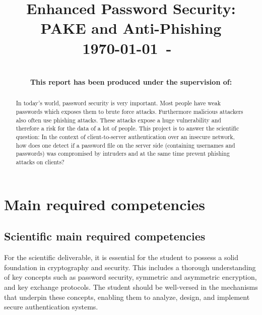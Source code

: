 \documentclass[conference,compsoc]{IEEEtran}
\begin{document}
\title{Enhanced Password Security: PAKE and Anti-Phishing\\
{\small \today~-~\currenttime}}
 
\author{
\\
{\bf This report has been produced under the supervision of:}\\
%
}

\maketitle

\begin{abstract}

In today's world, password security is very important. Most people have weak
	passwords which exposes them to brute force attacks. Furthermore
	malicious attackers also often use phishing attacks. These attacks
	expose a huge vulnerability and therefore a risk for the data of a lot
	of people. This project is to answer the scientific question: In the
	context of client-to-server authentication over an insecure network,
	how does one detect if a password file on the server side (containing
	usernames and passwords) was compromised by intruders and at the same
	time prevent phishing attacks on clients?

\end{abstract}

\IEEEpeerreviewmaketitle

\section{Main required competencies} 

\subsection{Scientific main required competencies} 
For the scientific deliverable, it is essential for the student to possess a
solid foundation in cryptography and security. This includes a thorough
understanding of key concepts such as password security, symmetric and
asymmetric encryption, and key exchange protocols. The student should be
well-versed in the mechanisms that underpin these concepts, enabling them to
analyze, design, and implement secure authentication systems.
\end{document}
